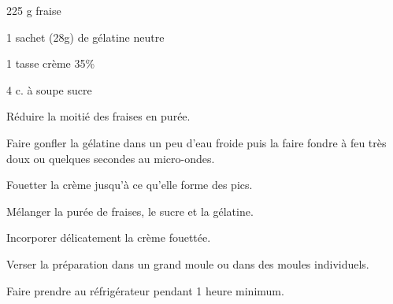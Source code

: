 


\totaltime{}


\begin{ingredients}
    \item 225 g fraise
    \item 1 sachet (28g) de gélatine neutre
    \item 1 tasse crème 35\%
    \item 4 c. à soupe sucre
\end{ingredients}

\begin{steps}
    \item Réduire la moitié des fraises en purée.
    \item Faire gonfler la gélatine dans un peu d'eau froide puis la faire fondre à feu très doux ou quelques secondes au micro-ondes.
    \item Fouetter la crème jusqu'à ce qu'elle forme des pics.
    \item Mélanger la purée de fraises, le sucre et la gélatine.
    \item Incorporer délicatement la crème fouettée.
    \item Verser la préparation dans un grand moule ou dans des moules individuels.
    \item Faire prendre au réfrigérateur pendant 1 heure minimum.
\end{steps}
